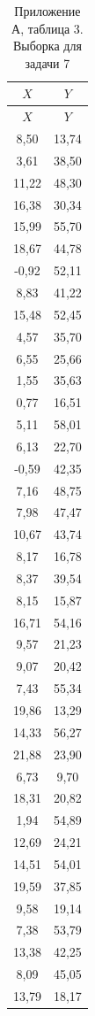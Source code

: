 \scriptsize
\setlength{\tabcolsep}{3pt}
\begin{longtable}{cc}
\caption{Приложение А, таблица 3. Выборка для задачи 7}\\
\toprule
$X$ & $Y$ \\
\midrule
\endfirsthead
\toprule
$X$ & $Y$ \\
\midrule
\endhead
8,50 & 13,74 \\
3,61 & 38,50 \\
11,22 & 48,30 \\
16,38 & 30,34 \\
15,99 & 55,70 \\
18,67 & 44,78 \\
-0,92 & 52,11 \\
8,83 & 41,22 \\
15,48 & 52,45 \\
4,57 & 35,70 \\
6,55 & 25,66 \\
1,55 & 35,63 \\
0,77 & 16,51 \\
5,11 & 58,01 \\
6,13 & 22,70 \\
-0,59 & 42,35 \\
7,16 & 48,75 \\
7,98 & 47,47 \\
10,67 & 43,74 \\
8,17 & 16,78 \\
8,37 & 39,54 \\
8,15 & 15,87 \\
16,71 & 54,16 \\
9,57 & 21,23 \\
9,07 & 20,42 \\
7,43 & 55,34 \\
19,86 & 13,29 \\
14,33 & 56,27 \\
21,88 & 23,90 \\
6,73 & 9,70 \\
18,31 & 20,82 \\
1,94 & 54,89 \\
12,69 & 24,21 \\
14,51 & 54,01 \\
19,59 & 37,85 \\
9,58 & 19,14 \\
7,38 & 53,79 \\
13,38 & 42,25 \\
8,09 & 45,05 \\
13,79 & 18,17 \\
\bottomrule
\end{longtable}
